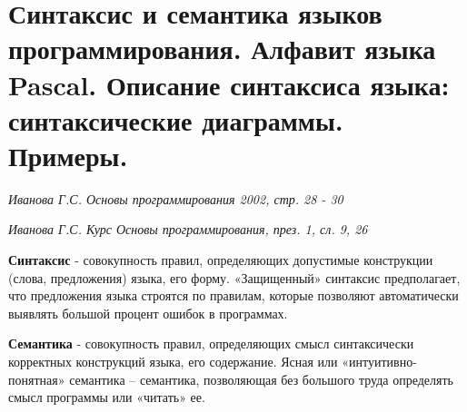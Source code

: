 


\newcommand{\hbook}[1]{{\begin{center}\textit{Иванова Г.С. Основы программирования 2002, стр. #1}\end{center}}}
\newcommand{\hprez}[2]{\begin{center}\textit{Иванова Г.С. Курс Основы программирования, през. #1, сл. #2}\end{center}}


% 
\toc



\newpage\section{Синтаксис  и  семантика  языков  программирования.  Алфавит  языка  Pascal.  Описание синтаксиса языка: синтаксические диаграммы. Примеры. }

\begin{myquote}
\hbook{28 - 30}

\hprez{1}{9, 26}
\end{myquote}

{\bf{Синтаксис}}
 - совокупность правил, определяющих допустимые конструкции (слова, предложения) языка, его форму. «Защищенный» синтаксис предполагает, что предложения языка строятся по правилам, которые позволяют автоматически выявлять большой процент ошибок в программах.

{\bf{Семантика}}
 - совокупность правил, определяющих смысл синтаксически корректных конструкций языка, его содержание. Ясная или «интуитивно-понятная» семантика – семантика, позволяющая без большого труда определять смысл программы или «читать» ее.

